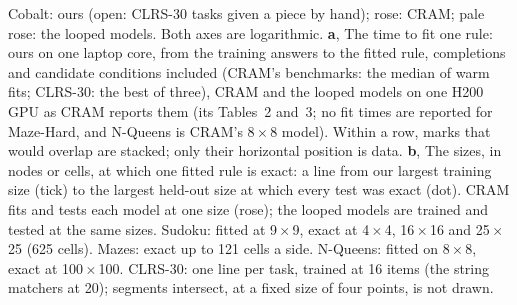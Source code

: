  Cobalt: ours (open: CLRS-30 tasks given a piece by
hand); rose: CRAM; pale rose: the looped models. Both axes are logarithmic. \textbf{a}, The time to fit one
rule: ours on one laptop core, from the training answers to the fitted rule, completions and candidate conditions
included (CRAM's benchmarks: the median of warm fits; CLRS-30: the best of three), CRAM and the looped models on one H200 GPU as CRAM reports them (its Tables~2 and~3; no fit times
are reported for Maze-Hard, and N-Queens is CRAM's 8\,$\times$\,8 model). Within a row, marks that would overlap are
stacked; only their horizontal position is data. \textbf{b}, The sizes, in nodes or cells, at which one fitted rule is
exact: a line from our largest training size (tick) to the largest held-out size at which every test was exact (dot).
CRAM fits and tests each model at one size (rose); the looped models are trained and tested at the same sizes. Sudoku:
fitted at 9\,$\times$\,9, exact at 4\,$\times$\,4, 16\,$\times$\,16 and 25\,$\times$\,25 (625 cells). Mazes: exact up to 121
cells a side. N-Queens: fitted on 8\,$\times$\,8, exact at 100\,$\times$\,100. CLRS-30: one line per task, trained at
16 items (the string matchers at 20); segments intersect, at a fixed size of four points, is not drawn.
